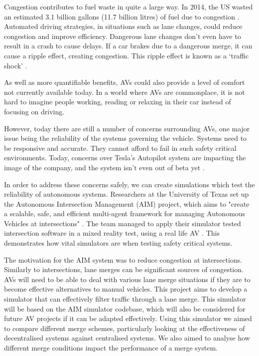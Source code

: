 Congestion contributes to fuel waste in quite a large way. In 2014, the US wasted an estimated 3.1 billion gallons (11.7 billion litres) of fuel due to congestion \citep{Schrank2015}. Automated driving strategies, in situations such as lane changes, could reduce congestion and improve efficiency. Dangerous lane changes don't even have to result in a crash to cause delays. If a car brakes due to a dangerous merge, it can cause a ripple effect, creating congestion. This ripple effect is known as a `traffic shock' \citep{Daganzo1994}.

As well as more quantifiable benefits, AVs could also provide a level of comfort not currently available today. In a world where AVs are commonplace, it is not hard to imagine people working, reading or relaxing in their car instead of focusing on driving. 

However, today there are still a number of concerns surrounding AVs, one major issue being the reliability of the systems governing the vehicle. Systems need to be responsive and accurate. They cannot afford to fail in such safety critical environments. Today, concerns over Tesla's Autopilot system are impacting the image of the company, and the system isn't even out of beta yet \citep{TeslaCriticised}. 

In order to address these concerns safely, we can create simulations which test the reliability of autonomous systems. Researchers at the University of Texas set up the Autonomous Intersection Management (AIM) project, which aims to "create a scalable, safe, and efficient multi-agent framework for managing Autonomous Vehicles at intersections" \citep{AIMProject}. The team managed to apply their simulator tested intersection software in a mixed reality test, using a real life AV \citep{Quinlan2010}. This demonstrates how vital simulators are when testing safety critical systems.

The motivation for the AIM system was to reduce congestion at intersections. Similarly to intersections, lane merges can be significant sources of congestion. AVs will need to be able to deal with various lane merge situations if they are to become effective alternatives to manual vehicles. This project aims to develop a simulator that can effectively filter traffic through a lane merge. This simulator will be based on the AIM simulator codebase, which will also be considered for future AV projects if it can be adapted effectively. Using this simulator we aimed to compare different merge schemes, particularly looking at the effectiveness of decentralised systems against centralised systems. We also aimed to analyse how different merge conditions impact the performance of a merge system.

